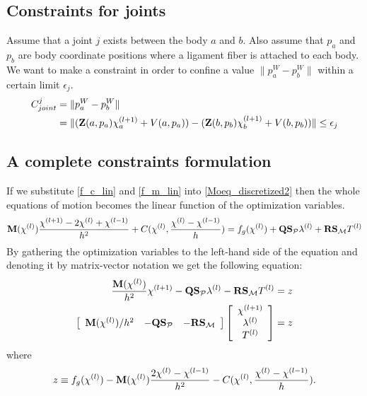 \documentclass[a4paper,10pt]{article}
\begin{document}
\subsection{Constraints for joints}
Assume that a joint $j$ exists between the body $a$ and $b$. Also assume that
$p_a$ and $p_b$ are body coordinate positions where a ligament fiber is attached
to each body. We want to make a constraint in order to confine a value $\|p_a^W-p_b^W\|$ within
a certain limit $\epsilon_j$.
\begin{align}
C_{joint}^j  & = \| p_a^W - p_b^W \| \notag\\
             & = \| ( \mathbf{Z}(a,p_a) \chi^{(l+1)}_a + V(a,p_a) ) - ( \mathbf{Z}(b,p_b) \chi^{(l+1)}_b + V(b,p_b) ) \| \leq \epsilon_j
\end{align}

\subsection{A complete constraints formulation}
If we substitute \eqref{f_c_lin} and \eqref{f_m_lin} into \eqref{Moeq_discretized2}
then the whole equations of motion becomes the linear function of the
optimization variables.
\begin{equation}\label{Moeq_discretized3}
\mathbf{M}(\chi^{(l)}) \frac{\chi^{(l+1)}-2\chi^{(l)}+\chi^{(l-1)}}{h^2} + C(\chi^{(l)}, \frac{\chi^{(l)} - \chi^{(l-1)}}{h})
= f_g(\chi^{(l)}) + \mathbf{Q} \mathbf{S}_\mathcal{P} \lambda^{(l)} + \mathbf{R} \mathbf{S}_\mathcal{M} T^{(l)}\notag
\end{equation}
By gathering the optimization variables to the left-hand side of the equation and
denoting it by matrix-vector notation we get the following equation:
\begin{align}\label{Moeq_constraint}
\frac{\mathbf{M}(\chi^{(l)})}{h^2}\chi^{(l+1)} - \mathbf{Q} \mathbf{S}_\mathcal{P} \lambda^{(l)} - \mathbf{R} \mathbf{S}_\mathcal{M} T^{(l)}
& = z \notag\\
\left [
\begin{array}{ccc}
\mathbf{M}(\chi^{(l)}) / h^2 & - \mathbf{Q} \mathbf{S}_\mathcal{P}  &  - \mathbf{R} \mathbf{S}_\mathcal{M}
\end{array}
\right ]
\left [
\begin{array}{c}
\chi^{(l+1)} \\
\lambda^{(l)} \\
T^{(l)}
\end{array}
\right ]
& = z
\end{align}
where
\begin{equation}
z \equiv f_g(\chi^{(l)}) - \mathbf{M}(\chi^{(l)})\frac{2\chi^{(l)}-\chi^{(l-1)}}{h^2} - C(\chi^{(l)}, \frac{\chi^{(l)} - \chi^{(l-1)}}{h}).\notag
\end{equation}
\end{document}
